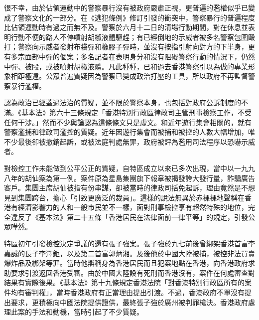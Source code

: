 很不幸，由於佔領運動中的警察暴行沒有被政府嚴肅正視，更普遍的濫權似乎已變成了警察文化的一部分。在《逃犯條例》修訂引發的衝突中，警察暴行的普遍程度比佔領運動時有過之而無不及。警察於六月十二日的清場行動期間，對在休息並表明行動不便的路人不停噴射胡椒液體驅趕；有已經倒地的示威者被多名警察包圍毆打；警察向示威者發射布袋彈和橡膠子彈時，並沒有按指引射向對方的下半身，更有多宗面部中彈的個案；多名記者在表明身分和沒有阻礙警察行動的情況下，仍然中彈、被毆，或被噴射胡椒液體。凡此種種，已和過去香港警察引以為傲的專業形象相距極遠。公眾普遍質疑因為警察已變成政治打壓的工具，所以政府不再監督警察暴行濫權。

認為政治已經蓋過法治的質疑，並不限於警察本身，也包括對政府公訴制度的不滿。《基本法》第六十三條規定「香港特別行政區律政司主管刑事檢察工作，不受任何干涉。」然而不少輿論認為這條條文只是虛文。和近年遊行集會相關的，就有警察濫捕和律政司濫控的質疑。近年因遊行集會而被捕和被控的人數大幅增加，唯不少最後卻被撤銷起訴，或被法庭判處無罪，政府被評為濫用司法程序以恐嚇示威者。


對檢控工作未能做到公平公正的質疑，自特區成立以來已多次出現，當中以一九九八年的胡仙案為第一例。案件原為星島集團旗下報章被揭發誇大發行量，詐騙廣告客戶。集團主席胡仙被指有份串謀，卻被當時的律政司括免起訴，理由竟然是不想見到集團跨台，擔心「引致更廣泛的裁員」。這樣的說法無異於赤裸裸地聲稱在香港有經濟影響力的人和一般市民並不一樣，面對刑事檢控享有超然特殊的地位，完全違反了《基本法》第二十五條「香港居民在法律面前一律平等」的規定，引發公眾嘩然。

特區初年引發檢控決定爭議的還有張子強案。張子強於九七前後曾綁架香港首富李嘉誠的長子李澤鉅，以及第二首富郭炳湘。及後他於中國大陸被捕，被控非法買賣爆炸品及綁架等罪。當時他辯稱身為香港居民而且犯案地點在香港，向香港政府求助要求引渡返回香港受審。由於中國大陸設有死刑而香港沒有，案件在何處審查對結果有實際後果。《基本法》第十九條規定香港法院「對香港特別行政區所有的案件均有審判權」，當時香港政府有正當理由提出引渡。不過，香港政府不單沒有提出要求，更積極向中國法院提供證供，最終張子強於廣州被判罪槍決。香港政府處理此案的手法和動機，當時引起了不少質疑。

